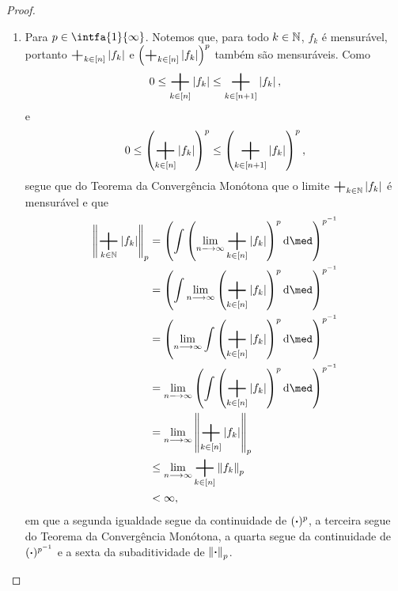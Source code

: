 \begin{proof}
\begin{enumerate}
\begin{enumerate}

	\item  Para $p \in \intfa{1}{\infty}$. Notemos que, para todo $k \in \mathbb{N}$, $f_k$ é mensurável, portanto $\sum_{k \in [n]} \abs{f_k}$ e $\left( \sum_{k \in [n]} \abs{f_k} \right)^p$ também são mensuráveis. Como
		\begin{equation*}
		0 \leq \sum_{k \in [n]} \abs{f_k} \leq \sum_{k \in [n+1]} \abs{f_k},
		\end{equation*}
e
		\begin{equation*}
		0 \leq \left( \sum_{k \in [n]} \abs{f_k} \right)^p \leq \left( \sum_{k \in [n+1]} \abs{f_k} \right)^p,
		\end{equation*}
segue que do Teorema da Convergência Monótona que o limite $\sum_{k \in \N} \abs{f_k}$ é mensurável e que
		\begin{align*}
		\nor{\sum_{k \in \N} \abs{f_k}}_p &= \left( \int \left( \lim_{n \to \infty} \sum_{k \in [n]} \abs{f_k} \right)^p \dd\med \right)^{p^{-1}} \\
			&= \left( \int \lim_{n \to \infty} \left( \sum_{k \in [n]} \abs{f_k} \right)^p \dd\med \right)^{p^{-1}} \\
			&= \left( \lim_{n \to \infty} \int \left( \sum_{k \in [n]} \abs{f_k} \right)^p \dd\med \right)^{p^{-1}} \\
			&= \lim_{n \to \infty} \left( \int \left( \sum_{k \in [n]} \abs{f_k} \right)^p \dd\med \right)^{p^{-1}} \\
			&= \lim_{n \to \infty} \nor{\sum_{k \in [n]} \abs{f_k}}_p \\
			&\leq \lim_{n \to \infty} \sum_{k \in [n]} \nor{f_k}_p \\
			&< \infty,
		\end{align*}
em que a segunda igualdade segue da continuidade de $(\bm{\cdot})^p$, a terceira segue do Teorema da Convergência Monótona, a quarta segue da continuidade de $(\bm{\cdot})^{p^{-1}}$ e a sexta da subaditividade de $\left\Vert{\bm{\cdot}}\right\Vert_p$.


\end{enumerate}
\end{enumerate}
\end{proof}
